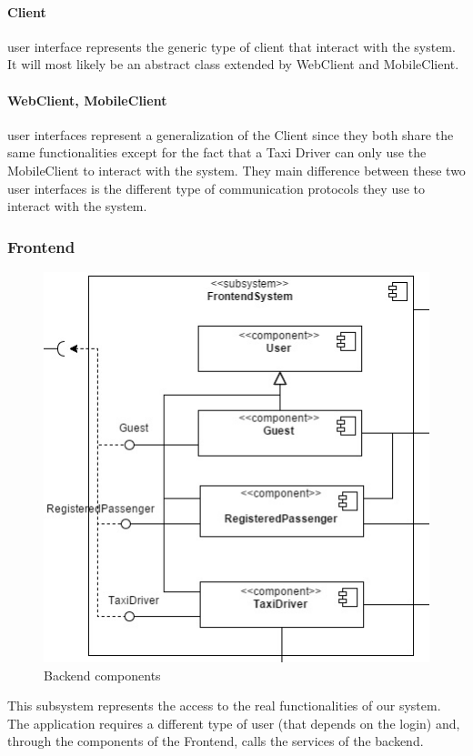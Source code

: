 		\paragraph{Client} user interface represents the generic type of client that interact with the system. It will most likely be an abstract class extended by WebClient and MobileClient.
		\paragraph{WebClient, MobileClient} user interfaces represent a generalization of the Client since they both share the same functionalities except for the fact that a Taxi Driver can only use the MobileClient to interact with the system. They main difference between these two user interfaces is the different type of communication protocols they use to interact with the system.
	\subsubsection{Frontend}
		\begin{figure}[h!]
			\begin{center}
				\includegraphics[width=1\linewidth]{../SE2_IMAGES/Frontend}
				\caption{Backend components}
			\end{center}
		\end{figure}
		This subsystem represents the access to the real functionalities of our system. The application requires
		a different type of user (that depends on the login) and, through the components of the Frontend, calls the
		services of the backend.
